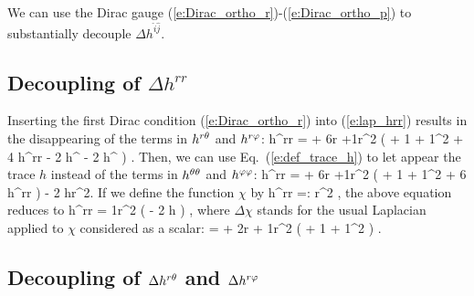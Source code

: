 We can use the Dirac gauge (\ref{e:Dirac_ortho_r})-(\ref{e:Dirac_ortho_p})
to substantially decouple $\Delta h^{\hat i\hat j}$.

\subsection{Decoupling of $\Delta h^{rr}$}

Inserting the first Dirac condition (\ref{e:Dirac_ortho_r}) into
(\ref{e:lap_hrr}) results in the disappearing of the terms
in $h^{r\theta}$ and $h^{r\varphi}$:
\be
   \Delta h^{rr} =  + 
  {6\over r} 
  +{1\over r^2} \left(  + {1\over\tan\th} 
   + {1\over\sin^2\th} 
  + 4 h^{rr} - 2 h^{\th\th} - 2 h^{\ph\ph} \right) .
\ee
Then, we can use Eq.~(\ref{e:def_trace_h}) to let appear the trace $h$
instead of the terms in $h^{\theta\theta}$ and $h^{\varphi\varphi}$:
\be
   \Delta h^{rr} =  + 
  {6\over r} 
  +{1\over r^2} \left(  + {1\over\tan\th} 
   + {1\over\sin^2\th} 
  + 6 h^{rr} \right) - 2 {h\over r^2}.
\ee
If we define the function $\chi$ by
\be
	h^{rr} =: {\chi \over r^2} ,
\ee
the above equation reduces to
\be
	\Delta h^{rr} = {1\over r^2} \left( \Delta \chi - 2 h \right) ,
\ee 
where $\Delta\chi$ stands for the usual Laplacian applied to $\chi$
considered as a scalar:
\be \label{e:lap_chi}
	\Delta \chi =  + {2\over r}
	+ {1\over r^2} \left( \dder{\chi}{\th} 
	+ {1\over\tan\th} \der{\chi}{\th}
	+ {1\over \sin^2\th} \dder{\chi}{\ph} \right) .
\ee

\subsection{Decoupling of $\Delta h^{r\theta}$ and $\Delta h^{r\varphi}$}

